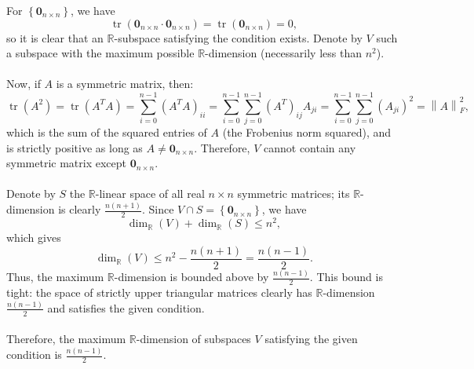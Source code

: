 \begin{solution}
    For \( \left\{ \mathbf{0}_{n \times n} \right\} \), we have
    \[
        \operatorname{tr}\left( \mathbf{0}_{n \times n} \cdot \mathbf{0}_{n \times n} \right) = \operatorname{tr}\left( \mathbf{0}_{n \times n} \right) = 0,
    \]
    so it is clear that an \( \mathbb{R} \)-subspace satisfying the condition exists. Denote by \( V \) such a subspace with the maximum possible \( \mathbb{R} \)-dimension (necessarily less than \( n^2 \)).
    \\\\
    Now, if \( A \) is a symmetric matrix, then:
    \[
        \operatorname{tr}\left( A^2 \right) = \operatorname{tr}\left( A^T A \right) = \sum_{i=0}^{n-1} \left( A^T A \right)_{ii} = \sum_{i=0}^{n-1} \sum_{j=0}^{n-1} \left( A^T \right)_{ij} A_{ji} = \sum_{i=0}^{n-1} \sum_{j=0}^{n-1} \left( A_{ji} \right)^2 = \left\| A \right\|_{F}^2,
    \]
    which is the sum of the squared entries of \( A \) (the Frobenius norm squared), and is strictly positive as long as \( A \neq \mathbf{0}_{n \times n} \). Therefore, \( V \) cannot contain any symmetric matrix except \( \mathbf{0}_{n \times n} \).
    \\\\
    Denote by \( S \) the \( \mathbb{R} \)-linear space of all real \( n \times n \) symmetric matrices; its \( \mathbb{R} \)-dimension is clearly \( \frac{n\left(n+1\right)}{2} \). Since \( V \cap S = \left\{ \mathbf{0}_{n \times n} \right\} \), we have
    \[
        \dim_{\mathbb{R}}\left( V \right) + \dim_{\mathbb{R}}\left( S \right) \leq n^2,
    \]
    which gives
    \[
        \dim_{\mathbb{R}}\left( V \right) \leq n^2 - \frac{n\left(n+1\right)}{2} = \frac{n\left(n-1\right)}{2}.
    \]
    Thus, the maximum \( \mathbb{R} \)-dimension is bounded above by \( \frac{n\left(n-1\right)}{2} \). This bound is tight: the space of strictly upper triangular matrices clearly has \( \mathbb{R} \)-dimension \( \frac{n\left(n-1\right)}{2} \) and satisfies the given condition.
    \\\\
    Therefore, the maximum \( \mathbb{R} \)-dimension of subspaces \( V \) satisfying the given condition is \( \frac{n\left(n-1\right)}{2} \).
\end{solution}
